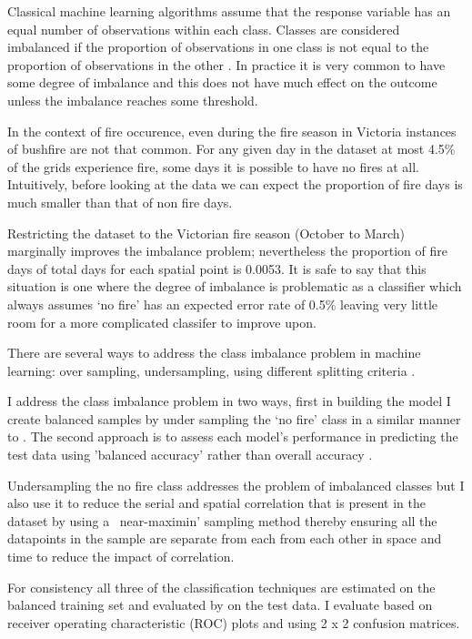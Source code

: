 \documentclass{article}
\begin{document}
Classical machine learning algorithms assume that the response variable has an equal number of observations within each class. Classes are considered imbalanced if the proportion of observations in one class is not equal to the proportion of observations in the other \citep{japkowicz00}. In practice it is very common to have some degree of imbalance and this does not have much effect on the outcome unless the imbalance reaches some threshold. 

In the context of fire occurence, even during the fire season in Victoria instances of bushfire are not that common. For any given day in the dataset at most 4.5\% of the grids experience fire, some days it is possible to have no fires at all. Intuitively, before looking at the data we can expect the proportion of fire days is much smaller than that of non fire days. 

Restricting the dataset to the Victorian fire season (October to March) marginally improves the imbalance problem; nevertheless the proportion of fire days of total days for each spatial point is 0.0053. It is safe to say that this situation is one where the degree of imbalance is problematic as a classifier which always assumes `no fire' has an expected error rate of 0.5\% leaving very little room for a more complicated classifer to improve upon. 

There are several ways to address the class imbalance problem in machine learning: over sampling, undersampling, using different splitting criteria \citep{japkowicz00}. 

I address the class imbalance problem in two ways, first in building the model I create balanced samples by under sampling the `no fire' class in a similar manner to \citep{padilla11}.  The second approach is to assess each model's performance in predicting the test data using 'balanced accuracy' rather than overall accuracy \citep{mosley13, japkowicz00}. 

Undersampling the no fire class addresses the problem of imbalanced classes but I also use it to reduce the serial and spatial correlation that is present in the dataset by using a ~near-maximin' sampling method thereby ensuring all the datapoints in the sample are separate from each from each other in space and time to reduce the impact of correlation. 

For consistency all three of the classification techniques are estimated on the balanced training set and evaluated by  on the test data. I evaluate based on receiver operating characteristic (ROC) plots  and using 2 x 2 confusion matrices. 
\end{document}
